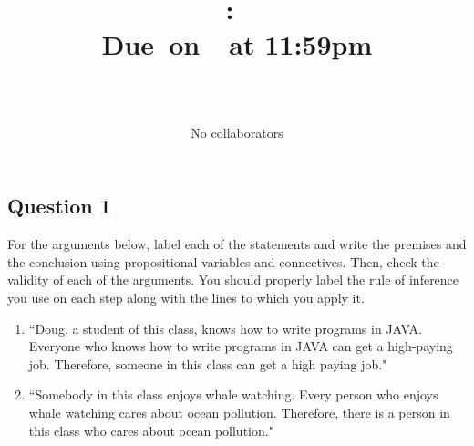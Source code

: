 \documentclass{article}
\title{
    \vspace{2in}
    \textbf{\hmwkClass:\ \hmwkTitle}\\
    \normalsize\vspace{0.1in}\small{Due\ on\ \hmwkDueDate\ at 11:59pm}\\
    \vspace{0.1in}\large{\textit{\hmwkClassInstructor}}
    \vspace{3in}
    \author{\textbf{\hmwkAuthorName} \\ \\ No collaborators}
    \date{}
}
\begin{document}
\maketitle
\pagebreak

\subsection*{Question 1} 
    For the arguments below, label each of the statements and write the premises and the conclusion using propositional variables and connectives. Then, check the validity of each of the arguments. You should properly label the rule of inference you use on each step along with the lines to which you apply it.
    \begin{enumerate}
        \item ``Doug, a student of this class, knows how to write programs in JAVA. Everyone who knows how to write programs in JAVA can get a high-paying job. Therefore, someone in this class can get a high paying job."
        \item ``Somebody in this class enjoys whale watching. Every person who enjoys whale watching cares about ocean pollution. Therefore, there is a person in this class who cares about ocean pollution."
    \end{enumerate}
\end{document}
